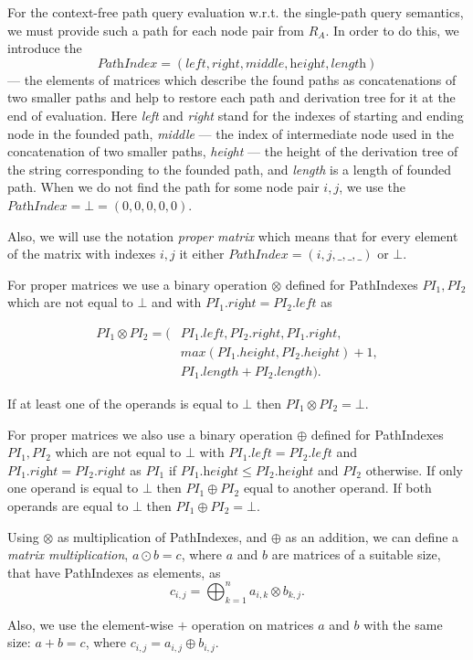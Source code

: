 For the context-free path query evaluation w.r.t. the single-path query semantics, we must provide such a path for each node pair from $R_A$. In order to do this, we introduce the 
$$\textit{PathIndex} = (\textit{left},\textit{right},\textit{middle},\textit{height},\textit{length})$$ 
--- the elements of matrices which describe the found paths as concatenations of two smaller paths and help to restore each path and derivation tree for it at the end of evaluation. Here \textit{left} and \textit{right} stand for the indexes of starting and ending node in the founded path, \textit{middle} --- the index of intermediate node used in the concatenation of two smaller paths, \textit{height} --- the height of the derivation tree of the string corresponding to the founded path, and \textit{length} is a length of founded path. When we do not find the path for some node pair $i,j$, we use the $\textit{PathIndex} = \bot = (0,0,0,0,0)$.

Also, we will use the notation \textit{proper matrix} which means that for every element of the matrix with indexes $i,j$ it either $\textit{PathIndex} = (i,j,\_,\_,\_)$ or $\bot$.

For proper matrices we use a binary operation $\otimes$ defined for PathIndexes \mbox{$PI_1, PI_2$} which are not equal to $\bot$ and with $PI_1.\textit{right} = PI_2.\textit{left}$ as 

\begin{align*}
PI_1 \otimes PI_2 = (&PI_1.left, PI_2.right, PI_1.right, \\
                     &max(PI_1.height, PI_2.height)+1,\\
                     &PI_1.length + PI_2.length).
\end{align*}

If at least one of the operands is equal to $\bot$ then $PI_1 \otimes PI_2 = \bot$.

For proper matrices we also use a binary operation $\oplus$ defined for PathIndexes \mbox{$PI_1, PI_2$} which are not equal to $\bot$ with $PI_1.\textit{left} = PI_2.\textit{left}$ and $PI_1.\textit{right} = PI_2.\textit{right}$ as $PI_1$ if $PI_1.\textit{height} \leq PI_2.\textit{height}$ and $PI_2$ otherwise. If only one operand is equal to $\bot$ then $PI_1 \oplus PI_2$ equal to another operand. If both operands are equal to $\bot$ then $PI_1 \oplus PI_2 = \bot$.

Using $\otimes$ as multiplication of PathIndexes, and $\oplus$ as an addition, we can define a \emph{matrix multiplication}, \mbox{$a \odot b = c$}, where $a$ and $b$ are matrices of a suitable size, that have PathIndexes as elements, as $$c_{i,j} = \bigoplus^{n}_{k=1}{a_{i,k} \otimes b_{k,j}}.$$

Also, we use the element-wise $+$ operation on matrices $a$ and $b$ with the same size: \mbox{$a + b = c$}, where $c_{i,j} = a_{i,j} \oplus b_{i,j}.$

